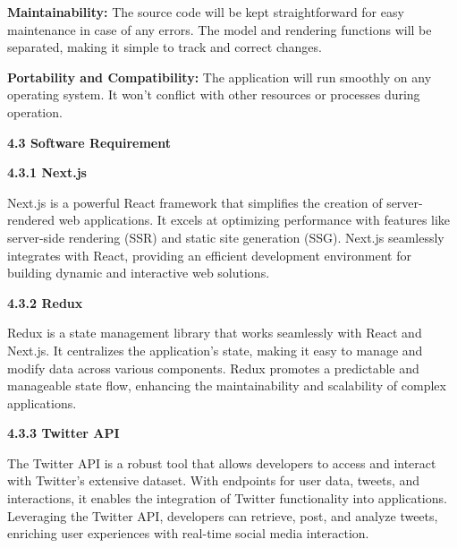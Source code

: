 \documentclass[a4paper,12pt]{article}
\begin{document}
{{{\textbf{Maintainability:} The source code will be kept straightforward for easy maintenance in case of any errors. The model and rendering functions will be separated, making it simple to track and correct changes.

\textbf{Portability and Compatibility:} The application will run smoothly on any operating system. It won't conflict with other resources or processes during operation.




\begin{flushleft}
			\fontsize{13}{15}\selectfont\textbf{4.3 Software Requirement}
			\label{soft}
		\end{flushleft}

\begin{flushleft}
			\fontsize{13}{15}\selectfont\textbf{4.3.1 Next.js}
			\label{next}
		\end{flushleft}
  Next.js is a powerful React framework that simplifies the creation of server-rendered web applications. It excels at optimizing performance with features like server-side rendering (SSR) and static site generation (SSG). Next.js seamlessly integrates with React, providing an efficient development environment for building dynamic and interactive web solutions.

  \begin{flushleft}
			\fontsize{13}{15}\selectfont\textbf{4.3.2 Redux}
			\label{redux}
		\end{flushleft}

 Redux is a state management library that works seamlessly with React and Next.js. It centralizes the application's state, making it easy to manage and modify data across various components. Redux promotes a predictable and manageable state flow, enhancing the maintainability and scalability of complex applications.

\newpage
 
\begin{flushleft}
			\fontsize{13}{15}\selectfont\textbf{4.3.3 Twitter API}
			\label{tweetapi}
		\end{flushleft}
 The Twitter API is a robust tool that allows developers to access and interact with Twitter's extensive dataset. With endpoints for user data, tweets, and interactions, it enables the integration of Twitter functionality into applications. Leveraging the Twitter API, developers can retrieve, post, and analyze tweets, enriching user experiences with real-time social media interaction.			


}}}
\end{document}
